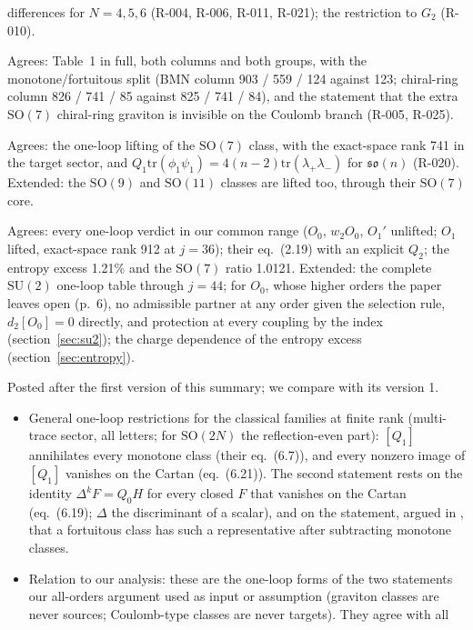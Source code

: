 \documentclass[11pt]{article}
\newcommand{\R}[1]{\textsf{R-0#1}}
\newcommand{\SU}{\mathrm{SU}}
\newcommand{\SO}{\mathrm{SO}}
\newcommand{\Gtwo}{G_2}
\newcommand{\ph}{\phi}
\newcommand{\ps}{\psi}
\begin{document}
\begin{description}[style=nextline,leftmargin=1.2em]
differences for $N=4,5,6$ (\R{04}, \R{06}, \R{11}, \R{21}); the restriction to $\Gtwo$ (\R{10}).
\item[Chang, Lin \cite{CLSduality}.] Agrees: Table~1 in full, both columns and both groups, with the
monotone/fortuitous split (BMN column 903 / 559 / 124 against 123; chiral-ring column 826 / 741 / 85 against
825 / 741 / 84), and the statement that the extra $\SO(7)$ chiral-ring graviton is invisible on the Coulomb branch
(\R{05}, \R{25}).
\item[Choi, Lee \cite{ChoiLee}.] Agrees: the one-loop lifting of the $\SO(7)$ class, with the exact-space rank 741 in
the target sector, and $Q_1\mathrm{tr}(\ph_1\ps_1)=4(n-2)\mathrm{tr}(\lambda_+\lambda_-)$ for $\mathfrak{so}(n)$ (\R{20}).
Extended: the $\SO(9)$ and $\SO(11)$ classes are lifted too, through their $\SO(7)$ core.
\item[Kim, Kim, Lee, Park \cite{KKLP}.] Agrees: every one-loop verdict in our common range ($O_0$, $w_2O_0$, $O_1'$
unlifted; $O_1$ lifted, exact-space rank 912 at $j=36$); their eq.~(2.19) with an explicit $Q_2$; the entropy excess
1.21\% and the $\SO(7)$ ratio 1.0121. Extended: the complete $\SU(2)$ one-loop table through $j=44$; for $O_0$, whose higher
orders the paper leaves open (p.~6), no admissible partner at any order given the selection rule, $d_2[O_0]=0$
directly, and protection at every coupling by the index (section~\ref{sec:su2}); the charge
dependence of the entropy excess (section~\ref{sec:entropy}).
\item[Kibe, van Leuven, Mathieson \cite{KVM}.] Posted after the first version of this summary; we compare with
its version 1.
\begin{itemize}
\item General one-loop restrictions for the classical families at finite rank (multi-trace sector, all letters; for
$\SO(2N)$ the reflection-even part): $[Q_1]$ annihilates every monotone class (their eq.~(6.7)), and every nonzero
image of $[Q_1]$ vanishes on the Cartan (eq.~(6.21)). The second statement rests on the identity $\Delta^kF=Q_0H$ for
every closed $F$ that vanishes on the Cartan (eq.~(6.19); $\Delta$ the discriminant of a scalar), and on the statement, argued in \cite{CLSduality},
that a fortuitous class has such a representative after subtracting monotone classes.
\item Relation to our analysis: these are the one-loop forms of the two statements our all-orders argument used as
input or assumption (graviton classes are never sources; Coulomb-type classes are never targets). They agree with all

\end{itemize}
\end{description}
\end{document}
